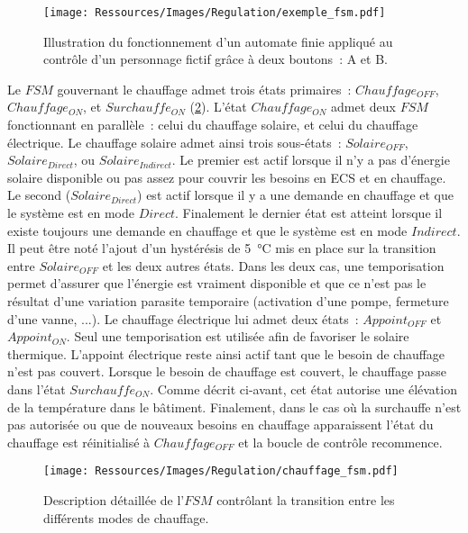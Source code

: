 \begin{figure}
    \begin{center}
        \texttt{[image: Ressources/Images/Regulation/exemple\_fsm.pdf]}
    \end{center}
    \caption{Illustration du fonctionnement d’un automate finie appliqué au contrôle
             d’un personnage fictif grâce à deux boutons~: A et B.
             \label{fig:automate_fini}}
\end{figure}

Le $FSM$ gouvernant le chauffage admet trois états primaires~: $Chauffage_{OFF}$,
$Chauffage_{ON}$, et $Surchauffe_{ON}$ (\ref{fig:automate_chauffage}). L’état
$Chauffage_{ON}$ admet deux $FSM$ fonctionnant en parallèle~: celui du chauffage
solaire, et celui du chauffage électrique. Le chauffage solaire admet ainsi trois sous-états~:
$Solaire_{OFF}$, $Solaire_{Direct}$, ou $Solaire_{Indirect}$. Le premier est actif lorsque
il n’y a pas d’énergie solaire disponible ou pas assez pour couvrir les besoins en ECS et
en chauffage. Le second ($Solaire_{Direct}$) est actif lorsque il y a une demande en
chauffage et que le système est en mode $Direct$. Finalement le dernier état est atteint
lorsque il existe toujours une demande en chauffage et que le système est en mode
$Indirect$.
Il peut être noté l’ajout d’un hystérésis de \SI{5}{\celsius} mis en place sur la
transition entre $Solaire_{OFF}$ et les deux autres états. Dans les deux cas, une
temporisation permet d’assurer que l’énergie est vraiment disponible et que ce n’est pas
le résultat d’une variation parasite temporaire (activation d’une pompe, fermeture d’une
vanne, ...). Le chauffage électrique lui admet deux états~: $Appoint_{OFF}$ et
$Appoint_{ON}$. Seul une temporisation est utilisée afin de favoriser le solaire thermique.
L’appoint électrique reste ainsi actif tant que le besoin de chauffage n’est pas couvert.
Lorsque le besoin de chauffage est couvert, le chauffage passe dans l’état
$Surchauffe_{ON}$. Comme décrit ci-avant, cet état autorise une élévation de la température
dans le bâtiment. Finalement, dans le cas où la surchauffe n’est pas autorisée ou que de nouveaux
besoins en chauffage apparaissent l’état du chauffage est réinitialisé à $Chauffage_{OFF}$
et la boucle de contrôle recommence.

\begin{figure}
    \begin{center}
        \texttt{[image: Ressources/Images/Regulation/chauffage\_fsm.pdf]}
    \end{center}
    \caption{Description détaillée de l’$FSM$ contrôlant la transition entre
             les différents modes de chauffage.
             \label{fig:automate_chauffage}}
\end{figure}


